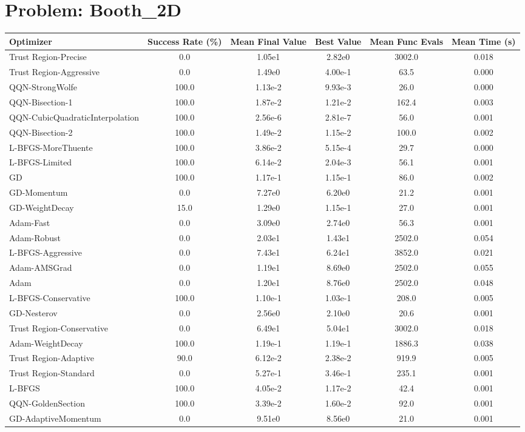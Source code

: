 \documentclass{article}
\begin{document}
\section{Problem: Booth\_2D}
\begin{longtable}{p{3cm}*{5}{c}}
\toprule
\textbf{Optimizer} & \textbf{Success Rate (\%)} & \textbf{Mean Final Value} & \textbf{Best Value} & \textbf{Mean Func Evals} & \textbf{Mean Time (s)} \\
\midrule
Trust Region-Precise & 0.0 & 1.05e1 & 2.82e0 & 3002.0 & 0.018 \\
Trust Region-Aggressive & 0.0 & 1.49e0 & 4.00e-1 & 63.5 & 0.000 \\
QQN-StrongWolfe & 100.0 & 1.13e-2 & 9.93e-3 & 26.0 & 0.000 \\
QQN-Bisection-1 & 100.0 & 1.87e-2 & 1.21e-2 & 162.4 & 0.003 \\
QQN-CubicQuadraticInterpolation & 100.0 & 2.56e-6 & 2.81e-7 & 56.0 & 0.001 \\
QQN-Bisection-2 & 100.0 & 1.49e-2 & 1.15e-2 & 100.0 & 0.002 \\
L-BFGS-MoreThuente & 100.0 & 3.86e-2 & 5.15e-4 & 29.7 & 0.000 \\
L-BFGS-Limited & 100.0 & 6.14e-2 & 2.04e-3 & 56.1 & 0.001 \\
GD & 100.0 & 1.17e-1 & 1.15e-1 & 86.0 & 0.002 \\
GD-Momentum & 0.0 & 7.27e0 & 6.20e0 & 21.2 & 0.001 \\
GD-WeightDecay & 15.0 & 1.29e0 & 1.15e-1 & 27.0 & 0.001 \\
Adam-Fast & 0.0 & 3.09e0 & 2.74e0 & 56.3 & 0.001 \\
Adam-Robust & 0.0 & 2.03e1 & 1.43e1 & 2502.0 & 0.054 \\
L-BFGS-Aggressive & 0.0 & 7.43e1 & 6.24e1 & 3852.0 & 0.021 \\
Adam-AMSGrad & 0.0 & 1.19e1 & 8.69e0 & 2502.0 & 0.055 \\
Adam & 0.0 & 1.20e1 & 8.76e0 & 2502.0 & 0.048 \\
L-BFGS-Conservative & 100.0 & 1.10e-1 & 1.03e-1 & 208.0 & 0.005 \\
GD-Nesterov & 0.0 & 2.56e0 & 2.10e0 & 20.6 & 0.001 \\
Trust Region-Conservative & 0.0 & 6.49e1 & 5.04e1 & 3002.0 & 0.018 \\
Adam-WeightDecay & 100.0 & 1.19e-1 & 1.19e-1 & 1886.3 & 0.038 \\
Trust Region-Adaptive & 90.0 & 6.12e-2 & 2.38e-2 & 919.9 & 0.005 \\
Trust Region-Standard & 0.0 & 5.27e-1 & 3.46e-1 & 235.1 & 0.001 \\
L-BFGS & 100.0 & 4.05e-2 & 1.17e-2 & 42.4 & 0.001 \\
QQN-GoldenSection & 100.0 & 3.39e-2 & 1.60e-2 & 92.0 & 0.001 \\
GD-AdaptiveMomentum & 0.0 & 9.51e0 & 8.56e0 & 21.0 & 0.001 \\
\bottomrule
\end{longtable}
\end{document}
